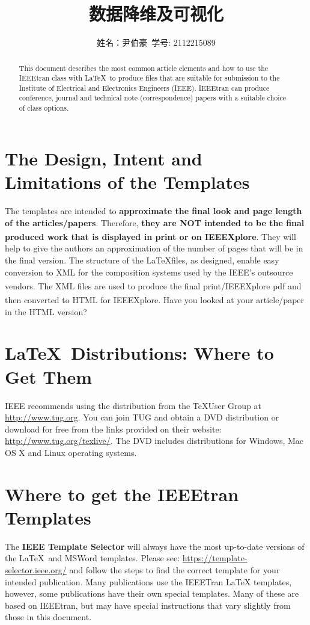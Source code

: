 \documentclass[lettersize,journal]{IEEEtran}
\begin{document}
\title{数据降维及可视化}
\author{姓名：尹伯豪\ 学号: 2112215089}

\maketitle

\begin{abstract}
This document describes the most common article elements and how to use the IEEEtran class with \LaTeX \ to produce files that are suitable for submission to the Institute of Electrical and Electronics Engineers (IEEE).  IEEEtran can produce conference, journal and technical note (correspondence) papers with a suitable choice of class options.
\end{abstract}

\section{The Design, Intent and \\ Limitations of the Templates}
\noindent The templates are intended to {\bf{approximate the final look and page length of the articles/papers}}. Therefore, {\bf{they are NOT intended to be the final produced work that is displayed in print or on IEEEXplore\textsuperscript{\textregistered}}}. They will help to give the authors an approximation of the number of pages that will be in the final version. The structure of the \LaTeX files, as designed, enable easy conversion to XML for the composition systems used by the IEEE's outsource vendors. The XML files are used to produce the final print/IEEEXplore\textsuperscript{\textregistered} pdf and then converted to HTML for IEEEXplore\textsuperscript{\textregistered}. Have you looked at your article/paper in the HTML version?

\section{\LaTeX \ Distributions: Where to Get Them}
\noindent IEEE recommends using the distribution from the \TeX User Group at \url{http://www.tug.org}. You can join TUG and obtain a DVD distribution or download for free  from the links provided on their website: \url{http://www.tug.org/texlive/}. The DVD includes distributions for Windows, Mac OS X and Linux operating systems.
 
\section{Where to get the IEEEtran Templates}
\noindent The {\bf{IEEE Template Selector}} will always have the most up-to-date versions of the \LaTeX\ and MSWord templates. Please see: \url{https://template-selector.ieee.org/} and follow the steps to find the correct template for your intended publication. Many publications use the IEEETran LaTeX templates, however, some publications have their own special templates. Many of these are  based on IEEEtran, but may have special instructions that vary slightly from those in this document.
\end{document}
